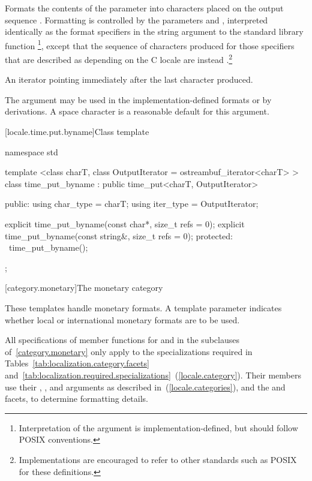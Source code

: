 \begin{itemdescr}
\pnum
\effects
Formats the contents of the parameter 
into characters placed on the output sequence .
Formatting is controlled by the parameters  and ,
interpreted identically as the format specifiers in the string
argument to the standard library function
%
\footnote{Interpretation of the 
argument is implementation-defined, but should follow POSIX
conventions.},
except that the sequence of characters produced for those specifiers
that are described as depending on the C locale are instead .\footnote{Implementations are encouraged to refer to other standards
such as POSIX
for these definitions.}

\pnum
\returns
An iterator pointing immediately after the last character produced.
\begin{note}
The  argument may be used in the implementation-defined
formats or by derivations. A space character is a reasonable
default for this argument.
\end{note}
\end{itemdescr}

[locale.time.put.byname]{Class template }

%
\begin{codeblock}
namespace std {
  template <class charT, class OutputIterator = ostreambuf_iterator<charT> >
  class time_put_byname : public time_put<charT, OutputIterator>
  {
  public:
    using char_type = charT;
    using iter_type = OutputIterator;

    explicit time_put_byname(const char*, size_t refs = 0);
    explicit time_put_byname(const string&, size_t refs = 0);
  protected:
    ~time_put_byname();
  };
}
\end{codeblock}

[category.monetary]{The monetary category}

\pnum
These templates handle monetary formats.
A template parameter indicates whether
local or international monetary formats are to be used.

\pnum
All specifications of member functions for
and
in the subclauses of~\ref{category.monetary} only apply to the
specializations required in Tables~\ref{tab:localization.category.facets}
and~\ref{tab:localization.required.specializations}~(\ref{locale.category}).
Their members use their
,
,
and
arguments as described in~(\ref{locale.categories}), and the
and
facets, to determine formatting details.

